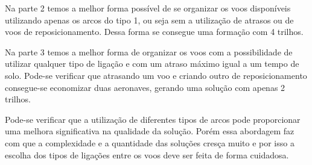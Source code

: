 Na parte 2 temos a melhor forma possível de se organizar os voos disponíveis
utilizando apenas os arcos do tipo 1, ou seja sem a utilização de atrasos ou de
voos de reposicionamento. Dessa forma se consegue uma formação com 4 trilhos.

Na parte 3 temos a melhor forma de organizar os voos com a possibilidade de
utilizar qualquer tipo de ligação e com um atraso máximo igual a um tempo de
solo. Pode-se verificar que atrasando um voo e criando outro de
reposicionamento consegue-se economizar duas aeronaves, gerando uma solução com
apenas 2 trilhos.

Pode-se verificar que a utilização de diferentes tipos de arcos pode
proporcionar uma melhora significativa na qualidade da solução. Porém essa
abordagem faz com que a complexidade e a quantidade das soluções
cresça muito e por isso a escolha dos tipos de ligações entre os voos
deve ser feita de forma cuidadosa.

